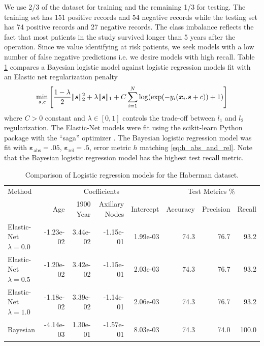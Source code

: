 \documentclass{article}[12pt]
\newcommand{\bvarepsabs}{\boldsymbol{\varepsilon}_\text{abs}}
\newcommand{\bvarepsrel}{\boldsymbol{\varepsilon}_\text{rel}}
\begin{document}
We use 2/3 of the dataset for training and the remaining 1/3 for testing. The training set has 151 positive records and 54 negative records while the testing set has 74 positive records and 27 negative records. The class imbalance reflects the fact that most patients in the study survived longer than 5 years after the operation. Since we value identifying at risk patients, we seek models with a low number of false negative predictions i.e. we desire models with high recall. Table \ref{tab:lr_models} compares a Bayesian logistic model against logistic regression models fit with an Elastic net regularization penalty
$$\min_{\boldsymbol{s},c} \left[\frac{1-\lambda}{2} \lVert \boldsymbol{s} \rVert_2^2 + \lambda \lVert \boldsymbol{s} \rVert_1+C\sum_{i=1}^N\log(\exp(-y_i(\boldsymbol{x}_i.\boldsymbol{s}+c))+1)\right]$$
where $C>0$ constant and $\lambda \in [0,1]$ controls the trade-off between $l_1$ and $l_2$ regularization. The Elastic-Net models were fit using the scikit-learn Python package with the ``saga'' optimizer \cite{scikit-learn}. The Bayesian logistic regression model was fit with $\bvarepsabs=.05$, $\bvarepsrel=.5$, error metric $h$ matching \eqref{eq:h_abs_and_rel}. Note that the Bayesian logistic regression model has the highest test recall metric.  

\begin{table}[H]
    \centering
    \begin{tabular}{l|rrrr|rrr}
        Method &\multicolumn{4}{|c|}{Coefficients} &\multicolumn{3}{c}{Test Metrics \%}\\
        {} &       Age &  1900 Year &  Axillary Nodes &  Intercept &  Accuracy &  Precision &   Recall \\
        \midrule
        Elastic-Net $\lambda=0.0$ & -1.23e-02 &   3.44e-02 &       -1.15e-01 &   1.99e-03 &     74.3 &      76.7 &   93.2 \\
        Elastic-Net $\lambda=0.5$ & -1.20e-02 &   3.42e-02 &       -1.15e-01 &   2.03e-03 &     74.3 &      76.7 &   93.2 \\
        Elastic-Net $\lambda=1.0$ & -1.18e-02 &   3.39e-02 &       -1.14e-01 &   2.06e-03 &     74.3 &      76.7 &   93.2 \\
        Bayesian                & -4.14e-03 &   1.30e-01 &       -1.57e-01 &   8.03e-03 &     74.3 &      74.0 &  100.0 \\
        \bottomrule
    \end{tabular}
    \caption{Comparison of Logistic regression models for the Haberman dataset.}
    \label{tab:lr_models}
\end{table}
\end{document}
